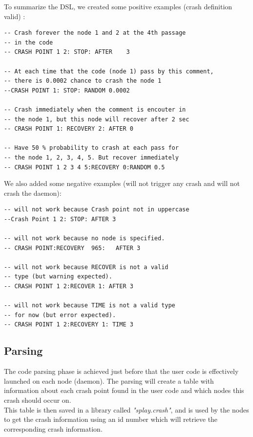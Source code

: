 \documentclass{eplmastersthesis}
\begin{document}
        To summarize the DSL, we created some positive examples (crash definition valid) :

        \begin{lstlisting}[style=MyLua]
-- Crash forever the node 1 and 2 at the 4th passage
-- in the code
-- CRASH POINT 1 2: STOP: AFTER    3

-- At each time that the code (node 1) pass by this comment,
-- there is 0.0002 chance to crash the node 1
--CRASH POINT 1: STOP: RANDOM 0.0002

-- Crash immediately when the comment is encouter in
-- the node 1, but this node will recover after 2 sec
-- CRASH POINT 1: RECOVERY 2: AFTER 0

-- Have 50 % probability to crash at each pass for
-- the node 1, 2, 3, 4, 5. But recover immediately
-- CRASH POINT 1 2 3 4 5:RECOVERY 0:RANDOM 0.5
          \end{lstlisting}

        We also added some negative examples (will not trigger any crash
        and will not crash the daemon):

        \begin{lstlisting}[style=MyLua]
-- will not work because Crash point not in uppercase
--Crash Point 1 2: STOP: AFTER 3

-- will not work because no node is specified.
-- CRASH POINT:RECOVERY  965:   AFTER 3

-- will not work because RECOVER is not a valid
-- type (but warning expected).
-- CRASH POINT 1 2:RECOVER 1: AFTER 3

-- will not work because TIME is not a valid type
-- for now (but error expected).
-- CRASH POINT 1 2:RECOVERY 1: TIME 3
        \end{lstlisting}

      \subsection{Parsing}

        The code parsing phase is achieved just before that the user code
        is effectively launched on each node (daemon). The parsing will
        create a table with information about each crash point found in the
        user code and which nodes this crash should occur on.\\
        This table is then saved in a library called \textit{"splay.crash"},
        and is used by the nodes to get the crash information using an id
        number which will retrieve the corresponding crash information.\\
\end{document}
